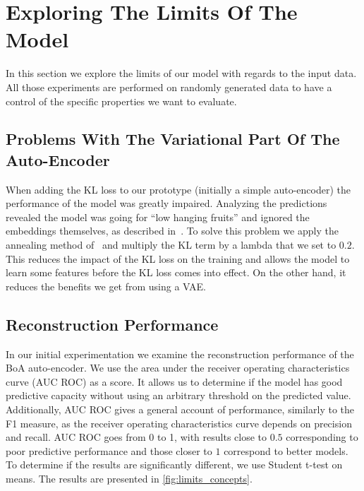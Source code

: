 \section{Exploring The Limits Of The Model}\label{seq:limits}
In this section we explore the limits of our model with regards to the input data.
All those experiments are performed on randomly generated data to have a control of the specific properties we want to evaluate.
    
\subsection{Problems With The Variational Part Of The Auto-Encoder}
When adding the KL loss to our prototype (initially a simple auto-encoder) the performance of the model was greatly impaired.
Analyzing the predictions revealed the model was going for ``low hanging fruits'' and ignored the embeddings themselves, as described in~\cite{annealing-kl:2015:bowman}.
To solve this problem we apply the annealing method of~\cite{annealing-kl:2015:bowman} and multiply the KL term by a lambda that we set to $0.2$.
This reduces the impact of the KL loss on the training and allows the model to learn some features before the KL loss comes into effect.
On the other hand, it reduces the benefits we get from using a VAE.%
    
\subsection{Reconstruction Performance}
In our initial experimentation we examine the reconstruction performance of the BoA auto-encoder.
We use the area under the receiver operating characteristics curve (AUC ROC) as a score.
It allows us to determine if the model has good predictive capacity without using an arbitrary threshold on the predicted value.
Additionally, AUC ROC gives a general account of performance, similarly to the F1 measure, as the receiver operating characteristics curve depends on precision and recall.
AUC ROC goes from 0 to 1, with results close to $0.5$ corresponding to poor predictive performance and those closer to $1$ correspond to better models.
To determine if the results are significantly different, we use Student t-test on means.
The results are presented in \autoref{fig:limits_concepts}.

